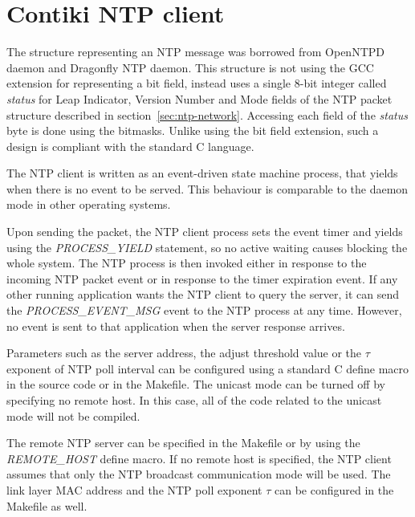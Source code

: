 
\section{Contiki NTP client}
The structure representing an NTP message was borrowed from OpenNTPD daemon
and Dragonfly NTP daemon.
This structure is not using the GCC extension for representing a bit field,
instead uses a single 8-bit integer called {\it{status}}
for Leap Indicator, Version Number and Mode fields of the NTP packet
structure described in section~\ref{sec:ntp-network}.
Accessing each field of the {\it{status}} byte is done using the bitmasks.
Unlike using the bit field extension,
such a design is compliant with the standard C language.

The NTP client is written as an event-driven state machine process,
that yields when there is no event to be served.
This behaviour is comparable to the daemon mode in other operating systems.

Upon sending the packet, the NTP client process sets the event timer and yields
using the {\it{PROCESS\_YIELD}} statement,
so no active waiting causes blocking the whole system.
The NTP process is then invoked either in response to the incoming NTP packet event
or in response to the timer expiration event.
If any other running application wants the NTP client to query the server,
it can send the {\it{PROCESS\_EVENT\_MSG}} event to the NTP process at any time.
However, no event is sent to that application when the server response arrives.

Parameters such as the server address, the adjust threshold value
or the $\tau$ exponent of NTP poll interval can be configured using a standard C define macro
in the source code or in the Makefile.
The unicast mode can be turned off by specifying no remote host.
In this case, all of the code related to the unicast mode will not be compiled.

The remote NTP server can be specified in the Makefile or
by using the {\it{REMOTE\_HOST}} define macro.
If no remote host is specified, the NTP client assumes that only the NTP broadcast communication mode will be used.
The link layer MAC address and the NTP poll exponent $\tau$
can be configured in the Makefile as well.


